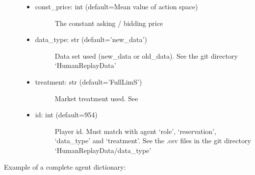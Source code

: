 \documentclass[letterpaper,10pt,english]{sphinxmanual}
\begin{document}
\begin{description}
\item[{}] \leavevmode\begin{itemize}
\item {} \begin{description}
\item[{const\_price: int (default=Mean value of action space)}] \leavevmode
\sphinxAtStartPar
The constant asking / bidding price

\end{description}

\end{itemize}

\item[{}] \leavevmode\begin{itemize}
\item {} \begin{description}
\item[{data\_type: str (default=’new\_data’)}] \leavevmode
\sphinxAtStartPar
Data set used (new\_data or old\_data). See the git directory ‘HumanReplayData’

\end{description}

\item {} \begin{description}
\item[{treatment: str (default=’FullLimS’)}] \leavevmode
\sphinxAtStartPar
Market treatment used. See 

\end{description}

\item {} \begin{description}
\item[{id: int (default=954)}] \leavevmode
\sphinxAtStartPar
Player id. Must match with agent ‘role’, ‘reservation’, ‘data\_type’ and ‘treatment’. See the .csv files in
the git directory ‘HumanReplayData/data\_type’

\end{description}

\end{itemize}

\end{description}

\sphinxAtStartPar
Example of a complete agent dictionary:
\end{document}
